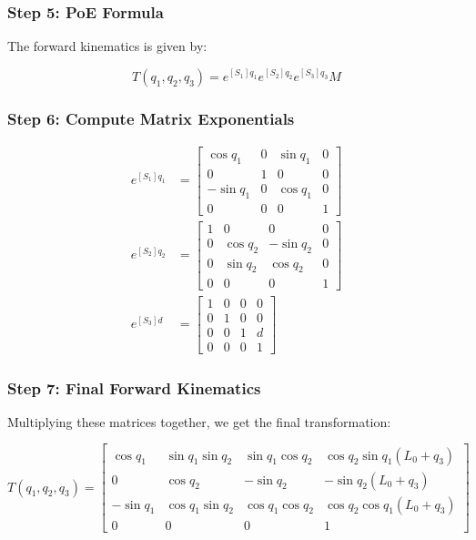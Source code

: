 \begin{solution}
\subsubsection*{Step 5: PoE Formula}
The forward kinematics is given by:

\begin{equation}
    T(q_1, q_2, q_3) = e^{[S_1]q_1} e^{[S_2]q_2} e^{[S_3]q_3} M
\end{equation}

\subsubsection*{Step 6: Compute Matrix Exponentials}
\begin{align*}
    e^{[S_1]q_1} &= \begin{bmatrix}
    \cos q_1 & 0 & \sin q_1 & 0 \\
    0 & 1 & 0 & 0 \\
    -\sin q_1 & 0 & \cos q_1 & 0 \\
    0 & 0 & 0 & 1
    \end{bmatrix} \\
    e^{[S_2]q_2} &= \begin{bmatrix}
    1 & 0 & 0 & 0 \\
    0 & \cos q_2 & -\sin q_2 & 0 \\
    0 & \sin q_2 & \cos q_2 & 0 \\
    0 & 0 & 0 & 1
    \end{bmatrix} \\
    e^{[S_3]d} &= \begin{bmatrix}
    1 & 0 & 0 & 0 \\
    0 & 1 & 0 & 0 \\
    0 & 0 & 1 & d \\
    0 & 0 & 0 & 1
    \end{bmatrix}
\end{align*}

\subsubsection*{Step 7: Final Forward Kinematics}
Multiplying these matrices together, we get the final transformation:

\begin{equation}
    T(q_1, q_2, q_3) = \begin{bmatrix}
    \cos q_1 & \sin q_1 \sin q_2 & \sin q_1 \cos q_2 & \cos q_2 \sin q_1 (L_0 + q_3) \\
    0 & \cos q_2 & -\sin q_2 & -\sin q_2 (L_0 + q_3) \\
    -\sin q_1 & \cos q_1 \sin q_2 & \cos q_1 \cos q_2 & \cos q_2 \cos q_1 (L_0 + q_3) \\
    0 & 0 & 0 & 1
    \end{bmatrix}
\end{equation}


\end{solution}
